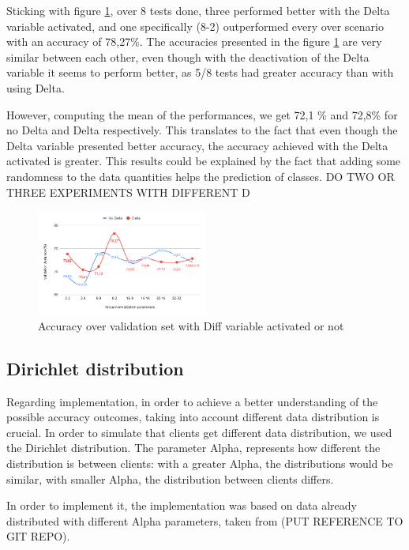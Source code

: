 \documentclass[twocolumn]{article}
\begin{document}
Sticking with figure \ref{AccDiff}, over 8 tests done, three performed better with the Delta variable activated, and one specifically (8-2) outperformed every over scenario with an accuracy of 78,27\%. The accuracies presented in the figure \ref{AccDiff} are very similar between each other, even though with the deactivation of the Delta variable it seems to perform better, as 5/8 tests had greater accuracy than with using Delta.

However, computing the mean of the performances, we get 72,1 \% and 72,8\% for no Delta and Delta respectively. This translates to the fact that even though the Delta variable presented better accuracy, the accuracy achieved with the Delta activated is greater. This results could be explained by the fact that adding some randomness to the data quantities helps the prediction of classes.
DO TWO OR THREE EXPERIMENTS WITH DIFFERENT D

\begin{figure}
    \centering
    \includegraphics[width=0.5\textwidth,height=.3\textheight]{groupnormalizationDeltaNoDelta.png}
    \caption{Accuracy over validation set with Diff variable activated or not}
     \label{AccDiff} 
\end{figure}

\subsection{Dirichlet distribution}

Regarding implementation, in order to achieve a better understanding of the possible accuracy outcomes, taking into account different data distribution is crucial. In order to simulate that clients get different data distribution, we used the Dirichlet distribution. The parameter Alpha, represents how different the distribution is between clients: with a greater Alpha, the distributions 
would be similar, with smaller Alpha, the distribution between clients differs.

In order to implement it, the implementation was based on data already distributed with different Alpha parameters, taken from (PUT REFERENCE TO GIT REPO).
\end{document}
